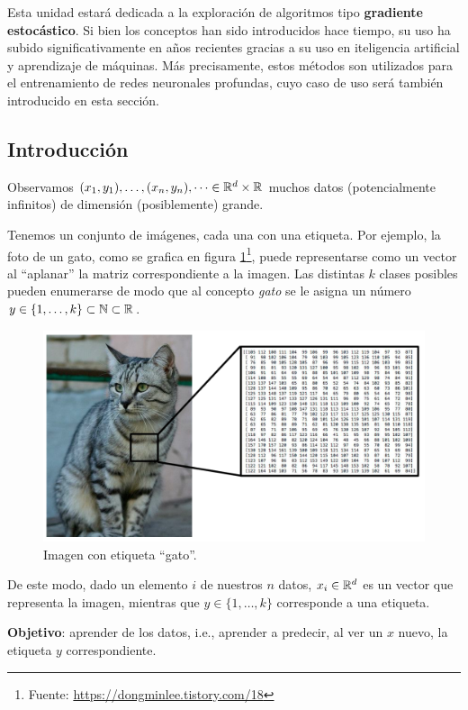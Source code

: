 Esta unidad estará dedicada a la exploración de algoritmos tipo \textbf{gradiente estocástico}. Si bien los conceptos han sido introducidos hace tiempo, su uso ha subido significativamente en años recientes gracias a su uso en iteligencia artificial y aprendizaje de máquinas. Más precisamente, estos métodos son utilizados para el entrenamiento de redes neuronales profundas, cuyo caso de uso será también introducido en esta sección.

\subsection{Introducción}
Observamos  $(x_1,y_1),\dots,(x_n,y_n),\dots\in\mathbb{R}^d\times\mathbb{R}$ muchos datos (potencialmente infinitos) de dimensión (posiblemente) grande.
\begin{example}
Tenemos un conjunto de imágenes, cada una con una etiqueta. Por ejemplo, la foto de un gato, como se grafica en figura \ref{fig:gato}\footnote{Fuente: \url{https://dongminlee.tistory.com/18}}, puede representarse como un vector al ``aplanar'' la matriz correspondiente a la imagen. Las distintas $k$ clases posibles pueden enumerarse de modo que al concepto \textit{gato} se le asigna un número $y\in\{1,\dots,k\}\subset\mathbb{N}\subset\mathbb{R}$.
\begin{figure}
    \centering
    \includegraphics[scale=0.32]{img/figura_gato.png}
    \caption{Imagen con etiqueta ``gato''.}
    \label{fig:gato}
\end{figure}
De este modo, dado un elemento $i$ de nuestros $n$ datos, $x_i\in\mathbb{R}^d$ es un vector que representa la imagen, mientras que $y\in\{1,\dots,k\}$ corresponde a una etiqueta.
\end{example}
\newp \textbf{Objetivo}: aprender de los datos, i.e., aprender a predecir, al ver un $x$ nuevo, la etiqueta $y$ correspondiente.

